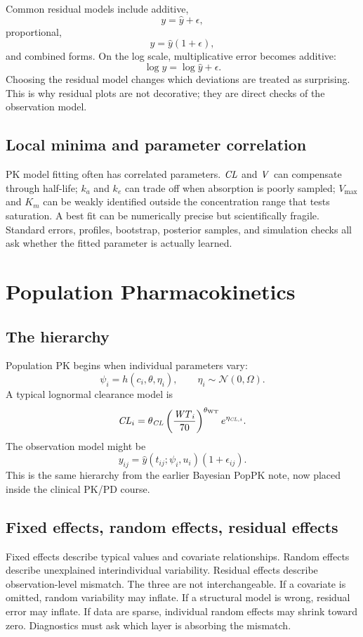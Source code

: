 \documentclass[a4paper]{article}
\newcommand{\Normal}{\mathcal{N}}
\newcommand{\pkCL}{\pksym{CL}}
\newcommand{\pkV}{\pksym{V}}
\begin{document}
Common residual models include additive,
\[
  y=\hat y+\epsilon,
\]
proportional,
\[
  y=\hat y(1+\epsilon),
\]
and combined forms. On the log scale, multiplicative error becomes additive:
\[
  \log y=\log \hat y+\epsilon.
\]
Choosing the residual model changes which deviations are treated as surprising. This is why residual plots are not decorative; they are direct checks of the observation model.

\subsection{Local minima and parameter correlation}

PK model fitting often has correlated parameters. \(\pkCL\) and \(\pkV\) can compensate through half-life; \(k_a\) and \(k_e\) can trade off when absorption is poorly sampled; \(V_{\max}\) and \(K_m\) can be weakly identified outside the concentration range that tests saturation. A best fit can be numerically precise but scientifically fragile. Standard errors, profiles, bootstrap, posterior samples, and simulation checks all ask whether the fitted parameter is actually learned.

\section{Population Pharmacokinetics}

\subsection{The hierarchy}

Population PK begins when individual parameters vary:
\[
  \psi_i = h(c_i,\theta,\eta_i),
  \qquad
  \eta_i\sim\Normal(0,\Omega).
\]
A typical lognormal clearance model is
\[
  \pkCL_i
  =
  \theta_{\pkCL}
  \left(\frac{\pksym{WT}_i}{70}\right)^{\theta_{\pklab{WT}}}
  e^{\eta_{\pkCL,i}}.
\]
The observation model might be
\[
  y_{ij}
  =
  \hat y(t_{ij};\psi_i,u_i)(1+\epsilon_{ij}).
\]
This is the same hierarchy from the earlier Bayesian PopPK note, now placed inside the clinical PK/PD course.

\figurePopPKHierarchy

\subsection{Fixed effects, random effects, residual effects}

Fixed effects describe typical values and covariate relationships. Random effects describe unexplained interindividual variability. Residual effects describe observation-level mismatch. The three are not interchangeable. If a covariate is omitted, random variability may inflate. If a structural model is wrong, residual error may inflate. If data are sparse, individual random effects may shrink toward zero. Diagnostics must ask which layer is absorbing the mismatch.
\end{document}
